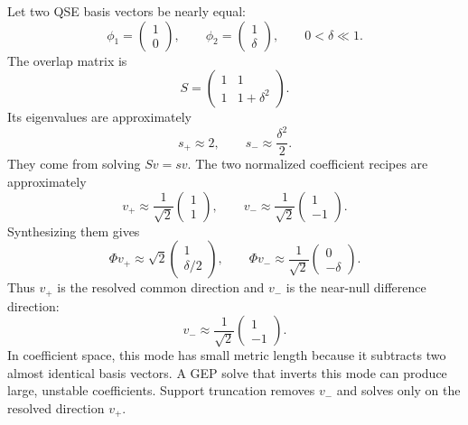 \documentclass[10pt,twocolumn]{article}
\begin{document}
Let two QSE basis vectors be nearly equal:
\begin{equation}
\phi_1=\begin{pmatrix}1\\0\end{pmatrix},
\qquad
\phi_2=\begin{pmatrix}1\\\delta\end{pmatrix},
\qquad
0<\delta\ll1.
\end{equation}
The overlap matrix is
\begin{equation}
S=\begin{pmatrix}1&1\\1&1+\delta^2\end{pmatrix}.
\end{equation}
Its eigenvalues are approximately
\begin{equation}
s_+\approx2,\qquad s_-\approx\frac{\delta^2}{2}.
\end{equation}
They come from solving \(Sv=s v\). The two normalized coefficient recipes are approximately
\begin{equation}
v_+\approx\frac1{\sqrt2}\begin{pmatrix}1\\1\end{pmatrix},
\qquad
v_-\approx\frac1{\sqrt2}\begin{pmatrix}1\\-1\end{pmatrix}.
\end{equation}
Synthesizing them gives
\begin{equation}
\Phi v_+\approx \sqrt2\begin{pmatrix}1\\\delta/2\end{pmatrix},
\qquad
\Phi v_-\approx \frac1{\sqrt2}\begin{pmatrix}0\\-\delta\end{pmatrix}.
\end{equation}
Thus \(v_+\) is the resolved common direction and \(v_-\) is the near-null difference direction:
\begin{equation}
v_-\approx\frac1{\sqrt2}\begin{pmatrix}1\\-1\end{pmatrix}.
\end{equation}
In coefficient space, this mode has small metric length because it subtracts two almost identical basis vectors. A GEP solve that inverts this mode can produce large, unstable coefficients. Support truncation removes $v_-$ and solves only on the resolved direction $v_+$.
\end{document}
